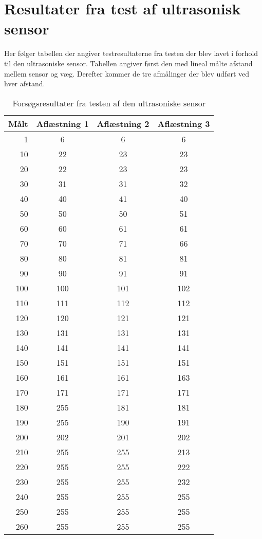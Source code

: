 \section{Resultater fra test af ultrasonisk sensor}
\label{appendix:ultrasonisk}
Her følger tabellen der angiver testresultaterne fra testen der blev lavet i forhold til den ultrasoniske sensor.
Tabellen angiver først den med lineal målte afstand mellem sensor og væg.
Derefter kommer de tre afmålinger der blev udført ved hver afstand.
\begin{table}[H]
\centering
\begin{tabular}{r | c | c | c |}
Målt & Aflæstning 1 & Aflæstning 2 & Aflæstning 3 \\
\hline
1 & 6 & 6 & 6 \\
10&	22&	23&	23\\
20&	22&	23&	23\\
30&	31&	31&	32\\
40&	40&	41&	40\\
50&	50&	50&	51\\
60&	60&	61&	61\\
70&	70&	71&	66\\
80&	80&	81&	81\\
90&	90&	91&	91\\
100&	100&	101&	102\\
110&	111&	112&	112\\
120&	120&	121&	121\\
130&	131&	131&	131\\
140&	141&	141&	141\\
150&	151&	151&	151\\
160&	161&	161&	163\\
170&	171&	171&	171\\
180&	255&	181&	181\\
190&	255&	190&	191\\
200&	202&	201&	202\\
210&	255&	255&	213\\
220&	255&	255&	222\\
230&	255&	255&	232\\
240&	255&	255&	255\\
250&	255&	255&	255\\
260&	255&	255&	255\\
\end{tabular}
\caption{Forsøgsresultater fra testen af den ultrasoniske sensor}
\label{sensor:ultrasonic_test_data}
\end{table}